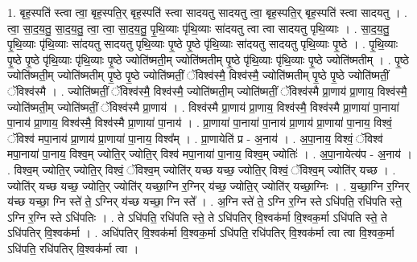 \documentclass[17pt]{extarticle}
\begin{document}
1. बृह॒स्पति॑ स्त्वा त्वा॒ बृह॒स्पति॒र् बृह॒स्पति॑ स्त्वा सादयतु सादयतु त्वा॒ बृह॒स्पति॒र् बृह॒स्पति॑ स्त्वा सादयतु । . त्वा॒ सा॒द॒य॒तु॒ सा॒द॒य॒तु॒ त्वा॒ त्वा॒ सा॒द॒य॒तु॒ पृ॒थि॒व्याः पृ॑थि॒व्याः सा॑दयतु त्वा त्वा सादयतु पृथि॒व्याः । . सा॒द॒य॒तु॒ पृ॒थि॒व्याः पृ॑थि॒व्याः सा॑दयतु सादयतु पृथि॒व्याः पृ॒ष्ठे पृ॒ष्ठे पृ॑थि॒व्याः सा॑दयतु सादयतु पृथि॒व्याः पृ॒ष्ठे । . पृ॒थि॒व्याः पृ॒ष्ठे पृ॒ष्ठे पृ॑थि॒व्याः पृ॑थि॒व्याः पृ॒ष्ठे ज्योति॑ष्मती॒म् ज्योति॑ष्मतीम् पृ॒ष्ठे पृ॑थि॒व्याः पृ॑थि॒व्याः पृ॒ष्ठे ज्योति॑ष्मतीम् । . पृ॒ष्ठे ज्योति॑ष्मती॒म् ज्योति॑ष्मतीम् पृ॒ष्ठे पृ॒ष्ठे ज्योति॑ष्मतीं॒ ॅविश्व॑स्मै॒ विश्व॑स्मै॒ ज्योति॑ष्मतीम् पृ॒ष्ठे पृ॒ष्ठे ज्योति॑ष्मतीं॒ ॅविश्व॑स्मै । . ज्योति॑ष्मतीं॒ ॅविश्व॑स्मै॒ विश्व॑स्मै॒ ज्योति॑ष्मती॒म् ज्योति॑ष्मतीं॒ ॅविश्व॑स्मै प्रा॒णाय॑ प्रा॒णाय॒ विश्व॑स्मै॒ ज्योति॑ष्मती॒म् ज्योति॑ष्मतीं॒ ॅविश्व॑स्मै प्रा॒णाय॑ । . विश्व॑स्मै प्रा॒णाय॑ प्रा॒णाय॒ विश्व॑स्मै॒ विश्व॑स्मै प्रा॒णाया॑ पा॒नाया॑ पा॒नाय॑ प्रा॒णाय॒ विश्व॑स्मै॒ विश्व॑स्मै प्रा॒णाया॑ पा॒नाय॑ । . प्रा॒णाया॑ पा॒नाया॑ पा॒नाय॑ प्रा॒णाय॑ प्रा॒णाया॑ पा॒नाय॒ विश्वं॒ ॅविश्व॑ मपा॒नाय॑ प्रा॒णाय॑ प्रा॒णाया॑ पा॒नाय॒ विश्व᳚म् । . प्रा॒णायेति॑ प्र - अ॒नाय॑ । . अ॒पा॒नाय॒ विश्वं॒ ॅविश्व॑ मपा॒नाया॑ पा॒नाय॒ विश्व॒म् ज्योति॒र् ज्योति॒र् विश्व॑ मपा॒नाया॑ पा॒नाय॒ विश्व॒म् ज्योतिः॑ । . अ॒पा॒नायेत्य॑प - अ॒नाय॑ । . विश्व॒म् ज्योति॒र् ज्योति॒र् विश्वं॒ ॅविश्व॒म् ज्योति॑र् यच्छ यच्छ॒ ज्योति॒र् विश्वं॒ ॅविश्व॒म् ज्योति॑र् यच्छ । . ज्योति॑र् यच्छ यच्छ॒ ज्योति॒र् ज्योति॑र् यच्छा॒ग्नि र॒ग्निर् य॑च्छ॒ ज्योति॒र् ज्योति॑र् यच्छा॒ग्निः । . य॒च्छा॒ग्नि र॒ग्निर् य॑च्छ यच्छा॒ ग्नि स्ते॑ ते॒ ऽग्निर् य॑च्छ यच्छा॒ ग्नि स्ते᳚ । . अ॒ग्नि स्ते॑ ते॒ ऽग्नि र॒ग्नि स्ते ऽधि॑पति॒ रधि॑पति स्ते॒ ऽग्नि र॒ग्नि स्ते ऽधि॑पतिः । . ते ऽधि॑पति॒ रधि॑पति स्ते॒ ते ऽधि॑पतिर् वि॒श्वक॑र्मा वि॒श्वक॒र्मा ऽधि॑पति स्ते॒ ते ऽधि॑पतिर् वि॒श्वक॑र्मा । . अधि॑पतिर् वि॒श्वक॑र्मा वि॒श्वक॒र्मा ऽधि॑पति॒ रधि॑पतिर् वि॒श्वक॑र्मा त्वा त्वा वि॒श्वक॒र्मा ऽधि॑पति॒ रधि॑पतिर् वि॒श्वक॑र्मा त्वा । \newline
\end{document}
